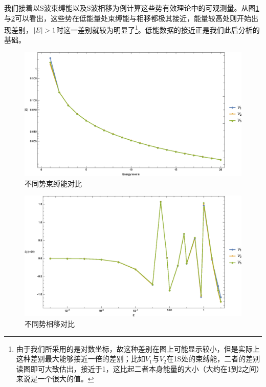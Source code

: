 \documentclass[cs4size,titlepage,twoside]{ctexart}
\begin{document}
我们接着以S波束缚能以及S波相移为例计算这些势有效理论中的可观测量。从图\ref{MPen}与\ref{MPps}可以看出，这些势在低能量处束缚能与相移都极其接近，能量较高处则开始出现差别，$\abs{E}>1$时这一差别就较为明显了\footnote{由于我们所采用的是对数坐标，故这种差别在图上可能显示较小，但是实际上这种差别最大能够接近一倍的差别；比如$V_1$与$V_2$在1S处的束缚能，二者的差别读图即可大致估出，接近于1，这比起二者本身能量的大小（大约在1到2之间）来说是一个很大的值。}。低能数据的接近正是我们此后分析的基础。
\begin{figure}[!htbp]
	\centering
	\includegraphics[width=6in]{MultiplePotential_1.eps}
	\caption{不同势束缚能对比}\label{MPen}
\end{figure}
\begin{figure}[!htbp]
	\centering
	\includegraphics[width=6in]{MultiplePotential_2.eps}
	\caption{不同势相移对比}\label{MPps}
\end{figure}
\end{document}
